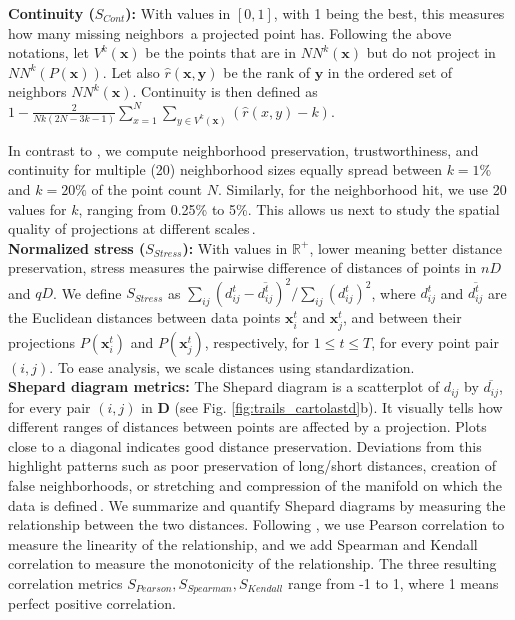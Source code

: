 \noindent
\textbf{Continuity ($S_{Cont}$):} With values in $[0,1]$, with 1 being the best, this measures how many missing neighbors\,\citep{Martins2014} a projected point has. Following the above notations, let $V^k(\mathbf{x})$
be the points that are in $NN^k(\mathbf{x})$ but do not project in $NN^k(P(\mathbf{x}))$. Let also $\hat{r}(\mathbf{x}, \mathbf{y})$ be the rank of $\mathbf{y}$ in the ordered set of neighbors $NN^k(\mathbf{x})$. Continuity is then defined as \linebreak
$1-\frac{2}{N k(2 N-3 k-1)} \sum_{x=1}^{N} \sum_{y \in V^k(\mathbf{x})}(\hat{r}(x, y)-k)$.

In contrast to \cite{Espadoto19}, we compute neighborhood preservation, trustworthiness, and continuity for multiple (20) neighborhood sizes equally spread between $k=1\%$ and $k=20\%$ of the point count $N$. Similarly, for the neighborhood hit, we use 20 values for $k$, ranging from 0.25\% to 5\%. This allows us next to study the spatial quality of projections at different scales\,\citep{Martins2015}.\\

\noindent
\textbf{Normalized stress ($S_{Stress}$):} With values in $\mathbb{R}^{+}$, lower meaning better distance preservation, stress measures the pairwise difference of distances of points in $nD$ and $qD$. We define $S_{Stress}$ as  $\sum_{i j}\left(d_{i j}^t - \overline{d_{i j}^t}\right)^{2} / \sum_{i j} (d_{i j}^t)^{2}$,
where $d_{i j}^t$ and $\overline{d_{i j}^t}$ are the Euclidean distances between data points $\mathbf{x}_i^t$ and $\mathbf{x}_j^t$, and between their projections $P(\mathbf{x}_i^t)$ and $P(\mathbf{x}_j^t)$, respectively, for $1 \leq t \leq T$, for every point pair $(i,j)$. To ease analysis, we scale distances using standardization.\\

\noindent
\textbf{Shepard diagram metrics:} The Shepard diagram is a scatterplot of $d_{ij}$ by $\overline{d_{ij}}$, for every pair $(i,j)$ in $\mathbf{D}$ (see Fig. \ref{fig:trails_cartolastd}b). It visually tells how different ranges of distances between points are affected by a projection. Plots close to a diagonal indicates good distance preservation.
Deviations from this highlight patterns such as poor preservation of long/short distances, creation of false neighborhoods, or stretching and compression of the manifold on which the data is defined\,\citep{Joia2011}. We summarize and quantify Shepard diagrams by measuring the relationship between the two distances. Following \cite{Espadoto19}, we use Pearson correlation to measure the linearity of the relationship, and we add Spearman and Kendall correlation to measure the monotonicity of the relationship. The three resulting correlation metrics $S_{Pearson}, S_{Spearman}, S_{Kendall}$ range from -1 to 1, where 1 means perfect positive correlation.

